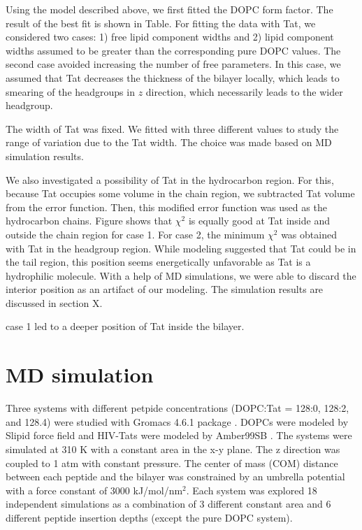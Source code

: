 \documentclass[12pt,letterpaper]{article}
\begin{document}
Using the model described above, we first fitted the DOPC form factor. The
result of the best fit is shown in Table. For fitting the data with Tat,
we considered two cases: 1) free lipid component widths and 2) lipid component
widths assumed to be greater than the corresponding pure DOPC values. The 
second case avoided increasing the number of free parameters. In this case,
we assumed that Tat decreases the thickness of the bilayer locally, which
leads to smearing of the headgroups in $z$ direction, which necessarily leads
to the wider headgroup. 

The width of Tat was fixed. We fitted with three different values to study
the range of variation due to the Tat width. The choice was made based on
MD simulation results.

We also investigated a possibility of Tat in the hydrocarbon region. For this,
because Tat occupies some volume in the chain region, we subtracted Tat
volume from the error function. Then, this modified error function was used
as the hydrocarbon chains. Figure shows that $\chi^2$ is equally good at 
Tat inside and outside the chain region for case 1. For case 2, the minimum
$\chi^2$ was obtained with Tat in the headgroup region. While modeling suggested
that Tat could be in the tail region, this position seems energetically 
unfavorable as Tat is a hydrophilic molecule. With a help of MD simulations,
we were able to discard the interior position as an artifact of our 
modeling. The simulation results are discussed in section X.

case 1 led to a deeper position of Tat inside the bilayer.

\section{MD simulation}
Three systems with different petpide concentrations (DOPC:Tat = 128:0, 128:2, and 128.4)
were studied with Gromacs 4.6.1 package \cite{ref:Hess08}. DOPCs were modeled by Slipid 
force field \cite{ref:Jambeck12_JPCB,ref:Jambeck12_JCTC} and HIV-Tats
were modeled by Amber99SB \cite{ref:Hornak06}. The systems were simulated at 
310 K with a constant
area in the x-y plane. The z direction was coupled to 1 atm with constant pressure. The
center of mass (COM) distance between each peptide and the bilayer was constrained by an
umbrella potential with a force constant of 3000 kJ/mol/nm$^2$. Each system was explored
18 independent simulations as a combination of 3 different constant area and 6 different
peptide insertion depths (except the pure DOPC system).
\end{document}
